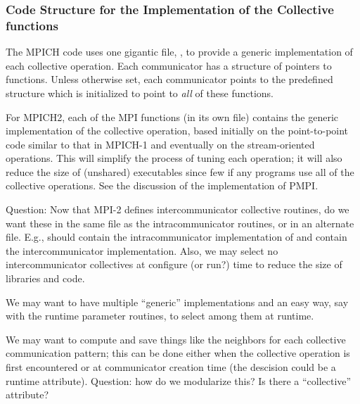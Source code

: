 

\subsubsection{Code Structure for the Implementation of the Collective
  functions} 

The MPICH code uses one gigantic file, , to provide a
generic implementation of each collective operation.  Each
communicator has a structure of pointers to functions.  Unless
otherwise set, each communicator points to the predefined structure
 which is
initialized to point to \emph{all} of 
these functions.  

For MPICH2, each of the MPI functions (in its own file) contains the generic
implementation of the collective operation, based initially on the
point-to-point code similar to that in MPICH-1 and eventually on the
stream-oriented operations.  This will simplify the process of tuning each
operation; it will also reduce the size of (unshared) executables since few if
any programs use all of the collective operations.
See the discussion of the implementation of PMPI.

Question: Now that MPI-2 defines intercommunicator collective
routines, do we want these in the same file as the intracommunicator
routines, or in an alternate file.  E.g., should  contain
the intracommunicator implementation of  and
 contain the intercommunicator implementation.
Also, we may select no intercommunicator collectives at configure (or run?)
time to reduce the size of libraries and code.

We may want to have multiple ``generic'' implementations and an easy
way, say with the runtime parameter routines, to select among them at runtime.

We may want to compute and save things like the neighbors for each
collective communication pattern; this can be done either when the
collective operation is first encountered or at communicator creation
time (the descision could be a runtime attribute).  Question: how do
we modularize this?  Is there a ``collective'' 
attribute?

